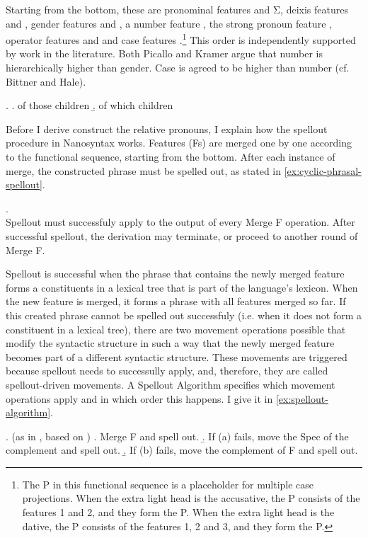 Starting from the bottom, these are pronominal features  and Σ, deixis features  and , gender features  and , a number feature , the strong pronoun feature , operator features  and  and case features .\footnote{
The P in this functional sequence is a placeholder for multiple case projections.
When the extra light head is the accusative, the P consists of the features 1 and 2, and they form the P.
When the extra light head is the dative, the P consists of the features 1, 2 and 3, and they form the P.
}
This order is independently supported by work in the literature. Both Picallo and Kramer argue that number is hierarchically higher than gender. Case is agreed to be higher than number (cf. Bittner and Hale).

\ex.
\a. of those children
\b. of which children

Before I derive construct the relative pronouns, I explain how the spellout procedure in Nanosyntax works. Features (Fs) are merged one by one according to the functional sequence, starting from the bottom. After each instance of merge, the constructed phrase must be spelled out, as stated in \ref{ex:cyclic-phrasal-spellout}.

\ex.  \citep{caha2020a}\\
Spellout must successfuly apply to the output of every Merge F operation. After successful spellout, the derivation may terminate, or proceed to another round of Merge F.\label{ex:cyclic-phrasal-spellout}

Spellout is successful when the phrase that contains the newly merged feature forms a constituents in a lexical tree that is part of the language's lexicon.
When the new feature is merged, it forms a phrase with all features merged so far.
If this created phrase cannot be spelled out successfuly (i.e. when it does not form a constituent in a lexical tree), there are two movement operations possible that modify the syntactic structure in such a way that the newly merged feature becomes part of a different syntactic structure.
These movements are triggered because spellout needs to successully apply, and, therefore, they are called spellout-driven movements.
A Spellout Algorithm specifies which movement operations apply and in which order this happens. I give it in \ref{ex:spellout-algorithm}.

\ex.  (as in \citealt{caha2020a}, based on \citealt{starke2018})\label{ex:spellout-algorithm}
 \a. Merge F and spell out.\label{ex:spellout-algorithm-phrasal}
 \b. If (a) fails, move the Spec of the complement and spell out.\label{ex:spellout-algorithm-spec}
 \b. If (b) fails, move the complement of F and spell out.\label{ex:spellout-algorithm-comp}

